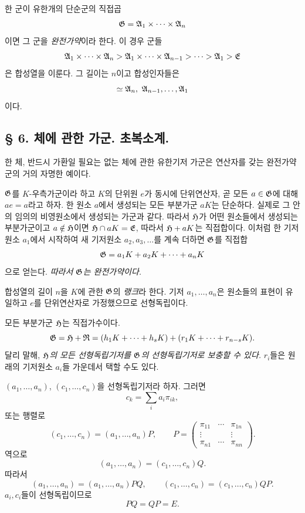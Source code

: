 한 군이 유한개의 단순군의 직접곱
\[
        \mathfrak G=\mathfrak A_1\times\cdots\times\mathfrak A_n
\]
이면 그 군을 \emph{완전가약}이라 한다. 이 경우 군들
\[
        \mathfrak A_1\times\cdots\times\mathfrak A_n
        >\mathfrak A_1\times\cdots\times\mathfrak A_{n-1}
        >\cdots>\mathfrak A_1>\mathfrak E
\]
은 합성열을 이룬다. 그 길이는 \(n\)이고 합성인자들은
\[
        \simeq\mA_n,\ \mA_{n-1},\ldots,\mA_1
\]
이다.

\subsection*{§ 6. 체에 관한 가군. 초복소계.}

한 체, 반드시 가환일 필요는 없는 체에 관한 유한기저 가군은 연산자를 갖는 완전가약군의 거의 자명한 예이다.

\(\mathfrak G\)를 \(K\)-우측가군이라 하고 \(K\)의 단위원 \(e\)가 동시에 단위연산자, 곧 모든 \(a\in\mathfrak G\)에 대해 \(ae=a\)라고 하자. 한 원소 \(a\)에서 생성되는 모든 부분가군 \(aK\)는 단순하다. 실제로 그 안의 임의의 비영원소에서 생성되는 가군과 같다. 따라서 \(\mathfrak H\)가 어떤 원소들에서 생성되는 부분가군이고 \(a\notin\mathfrak H\)이면 \(\mathfrak H\cap aK=\mathfrak E\), 따라서 \(\mathfrak H+aK\)는 직접합이다. 이처럼 한 기저원소 \(a_1\)에서 시작하여 새 기저원소 \(a_2,a_3,\ldots\)를 계속 더하면 \(\mathfrak G\)를 직접합
\[
        \mathfrak G=a_1K+a_2K+\cdots+a_nK
\]
으로 얻는다. \emph{따라서 \(\mathfrak G\)는 완전가약이다.}

합성열의 길이 \(n\)을 \(K\)에 관한 \(\mathfrak G\)의 \emph{랭크}라 한다. 기저 \(a_1,\ldots,a_n\)은 원소들의 표현이 유일하고 \(e\)를 단위연산자로 가정했으므로 선형독립이다.

모든 부분가군 \(\mathfrak H\)는 직접가수이다.
\[
        \mathfrak G=\mathfrak H+\mathfrak{R}
        =(h_1K+\cdots+h_sK)+(r_1K+\cdots+r_{n-s}K).
\]
달리 말해, \emph{\(\mathfrak H\)의 모든 선형독립기저를 \(\mathfrak G\)의 선형독립기저로 보충할 수 있다.} \(r_i\)들은 원래의 기저원소 \(a_i\)들 가운데서 택할 수도 있다.

\((a_1,\ldots,a_n)\), \((c_1,\ldots,c_n)\)을 선형독립기저라 하자. 그러면
\[
        c_k=\sum_i a_i\pi_{ik},
\]
또는 행렬로
\[
        (c_1,\ldots,c_n)=(a_1,\ldots,a_n)P,
        \qquad
        P=\begin{pmatrix}
        \pi_{11}&\cdots&\pi_{1n}\\
        \vdots&&\vdots\\
        \pi_{n1}&\cdots&\pi_{nn}
        \end{pmatrix}.
\]
역으로
\[
        (a_1,\ldots,a_n)=(c_1,\ldots,c_n)Q.
\]
따라서
\[
        (a_1,\ldots,a_n)=(a_1,\ldots,a_n)PQ,
        \qquad
        (c_1,\ldots,c_n)=(c_1,\ldots,c_n)QP.
\]
\(a_i,c_i\)들이 선형독립이므로
\[
        PQ=QP=E.
\]

